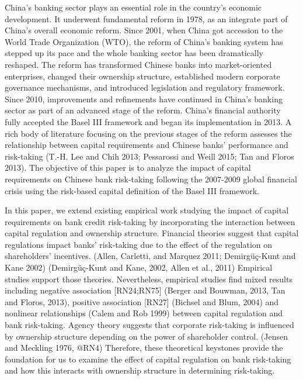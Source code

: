 \documentclass{article}
\begin{document}
China's banking sector plays an essential role in the country's economic
development. It underwent fundamental reform in 1978, as an integrate
part of China's overall economic reform. Since 2001, when China got
accession to the World Trade Organization (WTO), the reform of China's
banking system has stepped up its pace and the whole banking sector has
been dramatically reshaped. The reform has transformed Chinese banks
into market-oriented enterprises, changed their ownership structure,
established modern corporate governance mechanisms, and introduced
legislation and regulatory framework. Since 2010, improvements and
refinements have continued in China's banking sector as part of an
advanced stage of the reform. China's financial authority fully accepted
the Basel III framework and began its implementation in 2013. A rich
body of literature focusing on the previous stages of the reform
assesses the relationship between capital requirements and Chinese
banks' performance and risk-taking (T.-H. Lee and Chih 2013; Pessarossi
and Weill 2015; Tan and Floros 2013). The objective of this paper is to
analyze the impact of capital requirements on Chinese bank risk-taking
following the 2007-2009 global financial crisis using the risk-based
capital definition of the Basel III framework.

In this paper, we extend existing empirical work studying the impact of
capital requirements on bank credit risk-taking by incorporating the
interaction between capital regulation and ownership structure.
Financial theories suggest that capital regulations impact banks'
risk-taking due to the effect of the regulation on shareholders'
incentives. (Allen, Carletti, and Marquez 2011; Demirgüç-Kunt and Kane
2002) (Demirgüç-Kunt and Kane, 2002, Allen et al., 2011) Empirical
studies support those theories. Nevertheless, empirical studies find
mixed results including negative association {[}RN24;RN75{]} (Berger and
Bouwman, 2013, Tan and Floros, 2013), positive association {[}RN27{]}
(Bichsel and Blum, 2004) and nonlinear relationships (Calem and Rob
1999) between capital regulation and bank risk-taking. Agency theory
suggests that corporate risk-taking is influenced by ownership structure
depending on the power of shareholder control. (Jensen and Meckling
1976, @RN4) Therefore, these theoretical keystones provide the
foundation for us to examine the effect of capital regulation on bank
risk-taking and how this interacts with ownership structure in
determining risk-taking.
\end{document}
